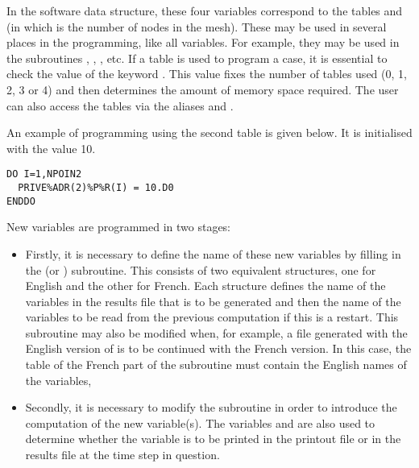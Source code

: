 In the software data structure, these four variables correspond to the tables
and  (in which  is the number of
nodes in the mesh). These may be used in several places in the programming,
like all \tel variables.
For example, they may be used in the subroutines ,
, , etc.
If a  table is used
to program a case, it is essential to check the value of the keyword
.
This value fixes the number of tables used (0, 1, 2, 3 or 4)
and then determines the amount of memory space required. The user can also
access the tables via the aliases  and
.

An example of programming using the second  table is given below.
It is initialised with the value 10.

\begin{lstlisting}[language=TelFortran]
DO I=1,NPOIN2
  PRIVE%ADR(2)%P%R(I) = 10.D0
ENDDO
\end{lstlisting}

New variables are programmed in two stages:

\begin{itemize}
\item  Firstly, it is necessary to define the name of these new variables by
filling in the  (or )
subroutine. This consists of two equivalent structures, one for English and the
other for French. Each structure defines the name of the variables in the
results file that is to be generated and then the name of the variables to be
read from the previous computation if this is a restart. This subroutine
may also be modified when, for example, a file generated with the English
version of  is to be continued with the French version. In this
case, the  table of the French part of the subroutine must
contain the English names of the variables,

\item  Secondly, it is necessary to modify the 
subroutine in order to introduce the computation of the new variable(s). The
variables  and  are also used to
determine whether the variable is to be printed in the printout file or in
the results file at the time step in question.
\end{itemize}


